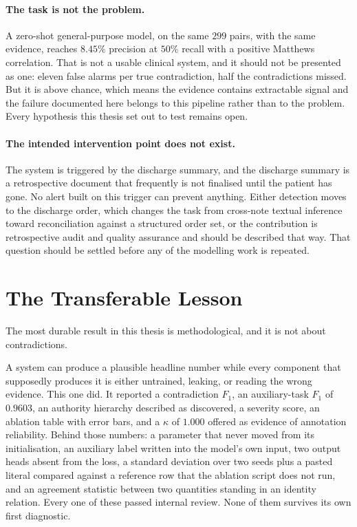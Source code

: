 \paragraph{The task is not the problem.} A zero-shot general-purpose model, on
the same $299$ pairs, with the same evidence, reaches $8.45\%$ precision at
$50\%$ recall with a positive Matthews correlation. That is not a usable
clinical system, and it should not be presented as one: eleven false alarms per
true contradiction, half the contradictions missed. But it is above chance,
which means the evidence contains extractable signal and the failure documented
here belongs to this pipeline rather than to the problem. Every hypothesis this
thesis set out to test remains open.

\paragraph{The intended intervention point does not exist.} The system is
triggered by the discharge summary, and the discharge summary is a retrospective
document that frequently is not finalised until the patient has gone. No alert
built on this trigger can prevent anything. Either detection moves to the
discharge order, which changes the task from cross-note textual inference toward
reconciliation against a structured order set, or the contribution is
retrospective audit and quality assurance and should be described that way. That
question should be settled before any of the modelling work is repeated.

\section{The Transferable Lesson}
\label{sec:conc-lesson}

The most durable result in this thesis is methodological, and it is not about
contradictions.

A system can produce a plausible headline number while every component that
supposedly produces it is either untrained, leaking, or reading the wrong
evidence. This one did. It reported a contradiction $F_1$, an auxiliary-task
$F_1$ of $0.9603$, an authority hierarchy described as discovered, a severity
score, an ablation table with error bars, and a $\kappa$ of $1.000$ offered as
evidence of annotation reliability. Behind those numbers: a parameter that never
moved from its initialisation, an auxiliary label written into the model's own
input, two output heads absent from the loss, a standard deviation over two
seeds plus a pasted literal compared against a reference row that the ablation
script does not run, and an agreement statistic between two quantities standing
in an identity relation. Every one of these passed internal review. None of them
survives its own first diagnostic.

